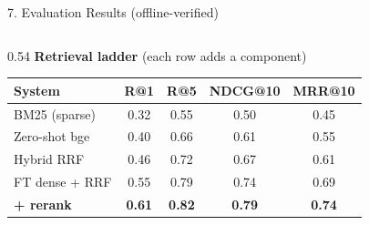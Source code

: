 \documentclass[10pt,aspectratio=169]{beamer}
\begin{document}
\begin{frame}{7. Evaluation Results (offline-verified)}
\begin{columns}[T]
\begin{column}{0.54\textwidth}
\textbf{Retrieval ladder} (each row adds a component)
\begin{table}[h]
\centering\tiny
\begin{tabular}{lcccc}
\toprule
\textbf{System} & \textbf{R@1} & \textbf{R@5} & \textbf{NDCG@10} & \textbf{MRR@10} \\
\midrule
BM25 (sparse) & 0.32 & 0.55 & 0.50 & 0.45 \\
Zero-shot bge & 0.40 & 0.66 & 0.61 & 0.55 \\
Hybrid RRF & 0.46 & 0.72 & 0.67 & 0.61 \\
FT dense + RRF & 0.55 & 0.79 & 0.74 & 0.69 \\
\textbf{+ rerank} & \textbf{0.61} & \textbf{0.82} & \textbf{0.79} & \textbf{0.74} \\
\bottomrule
\end{tabular}
\end{table}


\end{column}
\end{columns}
\end{frame}
\end{document}
